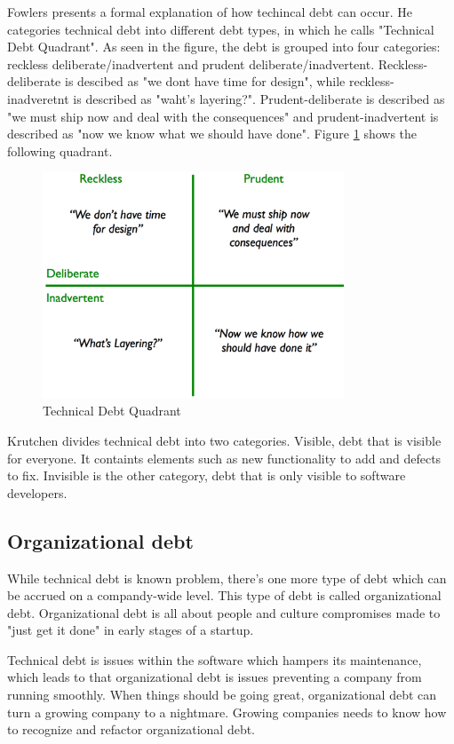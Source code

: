 Fowlers presents a formal explanation of how techincal debt can occur. He categories technical debt into different debt types, in which he calls "Technical Debt Quadrant". As seen in the figure, the debt is grouped into four categories: reckless deliberate/inadvertent and prudent deliberate/inadvertent. Reckless-deliberate is descibed as "we dont have time for design", while reckless-inadveretnt is described as "waht's layering?". Prudent-deliberate is described as "we must ship now and deal with the consequences" and prudent-inadvertent is described as "now we know what we should have done". Figure \ref{fig:techDebtQuad} shows the following quadrant.

\begin{figure}
	\includegraphics[width=0.8\textwidth]{images/techDebtQuadrant.png}
	\caption{Technical Debt Quadrant}
	\label{fig:techDebtQuad}
\end{figure}

Krutchen divides technical debt into two categories\cite{krutchen}. Visible, debt that is visible for everyone. It containts elements such as new functionality to add and defects to fix. Invisible is the other category, debt that is only visible to software developers.

\subsection{Organizational debt}
While technical debt is known problem, there's one more type of debt which can be accrued on a compandy-wide level. This type of debt is called organizational debt. Organizational debt is all about people and culture compromises made to "just get it done" in early stages of a startup\cite{steve-blank}.  

Technical debt is issues within the software which hampers its maintenance, which leads to that organizational debt is issues preventing a company from running smoothly. When things should be going great, organizational debt can turn a growing company to a nightmare. Growing companies needs to know how to recognize and refactor organizational debt. 


